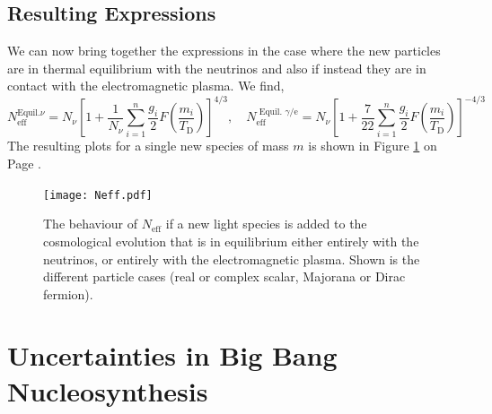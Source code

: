 \documentclass[11pt]{article}
\numberwithin{equation}{section}
\numberwithin{figure}{section}
\numberwithin{table}{section}
\begin{document}
\subsection{Resulting Expressions}


We can now bring together the expressions in the case where the new particles are in thermal equilibrium with the neutrinos and also if instead they are in contact with the electromagnetic plasma. We find,
\begin{equation}
N_{\mathrm{eff}}^{\mathrm{Equil} . \nu}=N_{\nu}\left[1+\frac{1}{N_{\nu}} \sum_{i=1}^{n} \frac{g_{i}}{2} F\left(\frac{m_{i}}{T_{\mathrm{D}}}\right)\right]^{4 / 3}, \quad N_{\mathrm{eff}}^{\text { Equil. } \gamma / \mathrm{e}}=N_{\nu}\left[1+\frac{7}{22} \sum_{i=1}^{n} \frac{g_{i}}{2} F\left(\frac{m_{i}}{T_{\mathrm{D}}}\right)\right]^{-4 / 3}
\end{equation}
The resulting plots for a single new species of mass $m$ is shown in Figure \ref{fig:neff} on Page \pageref{fig:neff}.


\begin{figure}[t]
\begin{center}
\texttt{[image: Neff.pdf]}
\caption{The behaviour of $N_{\mathrm{eff}}$ if a new light species is added to the cosmological evolution that is in equilibrium either entirely with the neutrinos, or entirely with the electromagnetic plasma. Shown is the different particle cases (real or complex scalar, Majorana or Dirac fermion).}\label{fig:neff}
\end{center}
\end{figure}


\section{Uncertainties in Big Bang Nucleosynthesis}
\end{document}
